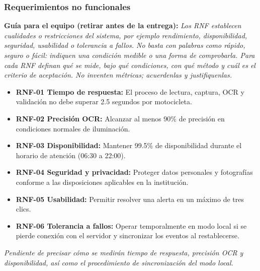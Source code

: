 \documentclass[12pt,letterpaper]{article}
\newcommand{\guia}[1]{\par\smallskip\noindent\textbf{Guía para el equipo (retirar antes de la entrega):} \textit{#1}\par\smallskip}
\begin{document}
\subsubsection{Requerimientos no funcionales}
\guia{Los RNF establecen cualidades o restricciones del sistema, por ejemplo rendimiento, disponibilidad, seguridad, usabilidad o tolerancia a fallos. No basta con palabras como rápido, seguro o fácil: indiquen una condición medible o una forma de comprobarla. Para cada RNF definan qué se mide, bajo qué condiciones, con qué método y cuál es el criterio de aceptación. No inventen métricas; acuerdenlas y justifiquenlas.}
\begin{itemize}
\item \textbf{RNF-01 Tiempo de respuesta:} El proceso de lectura, captura, OCR y validación no debe superar 2.5 segundos por motocicleta.
\item \textbf{RNF-02 Precisión OCR:} Alcanzar al menos 90\% de precisión en condiciones normales de iluminación.
\item \textbf{RNF-03 Disponibilidad:} Mantener 99.5\% de disponibilidad durante el horario de atención (06:30 a 22:00).
\item \textbf{RNF-04 Seguridad y privacidad:} Proteger datos personales y fotografías conforme a las disposiciones aplicables en la institución.
\item \textbf{RNF-05 Usabilidad:} Permitir resolver una alerta en un máximo de tres clics.
\item \textbf{RNF-06 Tolerancia a fallos:} Operar temporalmente en modo local si se pierde conexión con el servidor y sincronizar los eventos al restablecerse.
\end{itemize}
\textit{Pendiente de precisar cómo se medirán tiempo de respuesta, precisión OCR y disponibilidad, así como el procedimiento de sincronización del modo local.}
\end{document}
